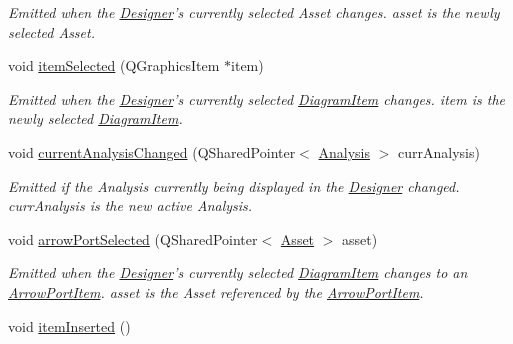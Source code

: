 \begin{DoxyCompactItemize}
\begin{DoxyCompactList}\small\item\em Emitted when the \hyperlink{class_designer}{Designer}'s currently selected Asset changes. asset is the newly selected Asset. \end{DoxyCompactList}\item 
\hypertarget{class_editor_state_a0404b2e2f2f10b818e71f12ec4b8e4cb}{void \hyperlink{class_editor_state_a0404b2e2f2f10b818e71f12ec4b8e4cb}{item\-Selected} (Q\-Graphics\-Item $\ast$item)}\label{class_editor_state_a0404b2e2f2f10b818e71f12ec4b8e4cb}

\begin{DoxyCompactList}\small\item\em Emitted when the \hyperlink{class_designer}{Designer}'s currently selected \hyperlink{class_diagram_item}{Diagram\-Item} changes. item is the newly selected \hyperlink{class_diagram_item}{Diagram\-Item}. \end{DoxyCompactList}\item 
void \hyperlink{class_editor_state_a50e0836cdfe1d8272171575b2f33a918}{current\-Analysis\-Changed} (Q\-Shared\-Pointer$<$ \hyperlink{class_picto_1_1_analysis}{Analysis} $>$ curr\-Analysis)
\begin{DoxyCompactList}\small\item\em Emitted if the Analysis currently being displayed in the \hyperlink{class_designer}{Designer} changed. curr\-Analysis is the new active Analysis. \end{DoxyCompactList}\item 
\hypertarget{class_editor_state_afef0aacb8483fa542087051f87ef8385}{void \hyperlink{class_editor_state_afef0aacb8483fa542087051f87ef8385}{arrow\-Port\-Selected} (Q\-Shared\-Pointer$<$ \hyperlink{class_picto_1_1_asset}{Asset} $>$ asset)}\label{class_editor_state_afef0aacb8483fa542087051f87ef8385}

\begin{DoxyCompactList}\small\item\em Emitted when the \hyperlink{class_designer}{Designer}'s currently selected \hyperlink{class_diagram_item}{Diagram\-Item} changes to an \hyperlink{class_arrow_port_item}{Arrow\-Port\-Item}. asset is the Asset referenced by the \hyperlink{class_arrow_port_item}{Arrow\-Port\-Item}. \end{DoxyCompactList}\item 
\hypertarget{class_editor_state_ad2d5531ffabffdc1db7e3e343f8ca8bf}{void \hyperlink{class_editor_state_ad2d5531ffabffdc1db7e3e343f8ca8bf}{item\-Inserted} ()}\label{class_editor_state_ad2d5531ffabffdc1db7e3e343f8ca8bf}


\end{DoxyCompactItemize}
